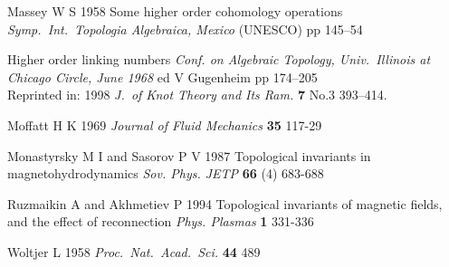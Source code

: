 \documentclass[10pt]{iopart}
\begin{document}
\begin{harvard}
\item[] Massey  W S  1958 
  Some higher order cohomology operations
  {\it Symp.~Int.~Topologia Algebraica, Mexico} (UNESCO) pp 145--54

\item[] 
  Higher order linking numbers
  {\it Conf. on Algebraic Topology, Univ.~Illinois at Chicago Circle,
    June 1968} 
  ed V Gugenheim pp 174--205\\
  Reprinted in: 1998 {\em J.~of Knot Theory and Its Ram.}
  {\bf 7} No.3 393--414.

\item[] Moffatt H K 1969 {\it  Journal of Fluid Mechanics}
  {\bf 35} 117-29


\item[] Monastyrsky M I and Sasorov P V  1987 
  Topological invariants in magnetohydrodynamics
  {\it Sov. Phys. JETP} {\bf 66} (4) 683-688

\item[] Ruzmaikin  A and  Akhmetiev P 1994
  Topological invariants of magnetic fields, and the effect of
  reconnection
  {\it Phys. Plasmas} {\bf 1} 331-336


\item[] Woltjer L 1958 {\it Proc.~Nat.~Acad.~Sci.} {\bf 44}  489 

\end{harvard}
\end{document}
